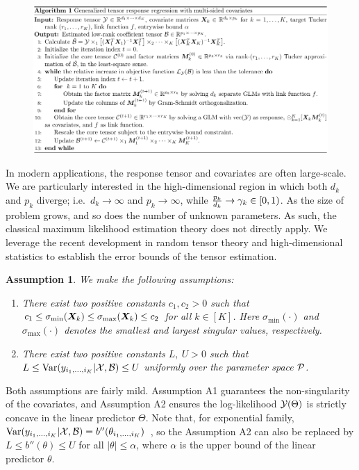 \documentclass[twoside]{article}
\theoremstyle{plain}
\newtheorem{assumption}{Assumption}
\theoremstyle{definition}
\begin{document}
\begin{figure}
\begin{center}
\includegraphics[width=17.5cm]{algorithm.pdf}
  \end{center}
  \end{figure}
  
 In modern applications, the response tensor and covariates are often large-scale. We are particularly interested in the high-dimensional region in which both $d_k$ and $p_k$ diverge; i.e.\ $d_k\to \infty$ and $p_k\to\infty$, while ${p_k\over d_k} \to \gamma_k \in[0,1)$. As the size of problem grows, and so does the number of unknown parameters. As such, the classical maximum likelihood estimation  theory does not directly apply. We leverage the recent development in random tensor theory and high-dimensional statistics to establish the error bounds of the tensor estimation. 

\begin{assumption}\label{ass}We make the following assumptions:
\vspace{-.5cm}
\begin{enumerate}
\item [A1.] There exist two positive constants $c_1, c_2>0$ such that $c_1\leq \sigma_{\min}(\bm X_k)\leq  \sigma_{\max}(\bm X_k)\leq c_2$ for all $k\in[K]$. Here $\sigma_{\text{min}}(\cdot)$ and $\sigma_{\text{max}}(\cdot)$ denotes the smallest and largest singular values, respectively.
\item [A2.] There exist two positive constants $L,\ U>0$ such that $L\leq \text{Var}(y_{i_1,\ldots,i_K}|\mathcal{X}, \mathcal{B})\leq U$ uniformly over the parameter space $\mathcal{P}$. 
\end{enumerate}
\end{assumption}
Both assumptions are fairly mild. Assumption A1 guarantees the non-singularity of the covariates, and Assumption A2 ensures the log-likelihood $\mathcal{Y}(\Theta)$ is strictly concave in the linear predictor $\Theta$. Note that, for exponential family, $\text{Var}(y_{i_1,\ldots,i_K}|\mathcal{X},\mathcal{B})=b''(\theta_{i_1,\ldots,i_K})$~\cite{mccullagh1989generalized}, so the Assumption A2 can also be replaced by $L\leq b''(\theta) \leq U$ for all $|\theta|\leq \alpha$, where $\alpha$ is the upper bound of the linear predictor $\theta$. 
\end{document}
